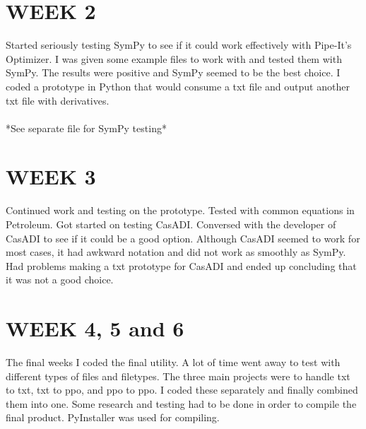 \documentclass[]{article}
\begin{document}
\section*{WEEK 2}
Started seriously testing SymPy to see if it could work effectively with Pipe-It's Optimizer. I was given some example files to work with and tested them with SymPy. The results were positive and SymPy seemed to be the best choice. I coded a prototype in Python that would consume a txt file and output another txt file with derivatives.
\\\\
*See separate file for SymPy testing*
\section*{WEEK 3}
Continued work and testing on the prototype. Tested with common equations in Petroleum. Got started on testing CasADI. Conversed with the developer of CasADI to see if it could be a good option. Although CasADI seemed to work for most cases, it had awkward notation and did not work as smoothly as SymPy. Had problems making a txt prototype for CasADI and ended up concluding that it was not a good choice.

\section*{WEEK 4, 5 and 6}
The final weeks I coded the final utility. A lot of time went away to test with different types of files and filetypes. The three main projects were to handle txt to txt, txt to ppo, and ppo to ppo. I coded these separately and finally combined them into one. Some research and testing had to be done in order to compile the final product. PyInstaller was used for compiling.



\end{document}
